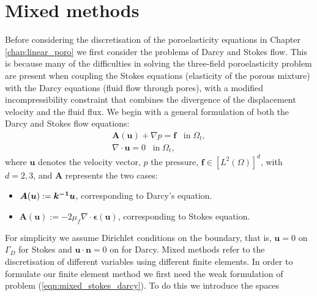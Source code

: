 \section{Mixed methods}
\label{sec:mixed}
Before considering the discretisation of the poroelasticity equations in Chapter \ref{chap:linear_poro} we first consider the problems of Darcy and Stokes flow. 
%
This is because many of the difficulties in solving the three-field poroelasticity problem are present when coupling the Stokes equations (elasticity of the porous mixture) with the Darcy equations (fluid flow through pores), with a modified incompressibility constraint that combines the divergence of the displacement velocity and the fluid flux.  
%
We begin with a general formulation of both the Darcy and Stokes flow equations:%
%
%
\begin{subequations}
\begin{align}
\boldsymbol{A}(\boldsymbol{u})+ \nabla p = \boldsymbol{f}\;\;\; \mbox{in} \; \Omega_{t},\\
\nabla \cdot \boldsymbol{u} =0\;\;\; \mbox{in} \; \Omega_{t},
\end{align}
\label{eqn:mixed_stokes_darcy}
\end{subequations}
where $\boldsymbol{u}$ denotes the velocity vector, $p$ the pressure, $\boldsymbol{f}\in[L^{2}(\Omega)]^{d}$, with $d=2,3$, and $\boldsymbol{A}$ represents the two cases:
\begin{itemize}
\item $\boldsymbol{A}(\boldsymbol{u}):=   \boldsymbol{k^{-1}} \boldsymbol{u}$, corresponding to Darcy's equation.
\item $\boldsymbol{A}(\boldsymbol{u}):= -2 \mu_{f} \nabla \cdot \mathbf{\epsilon}(\boldsymbol{u})$, corresponding to Stokes equation.
\end{itemize}
For simplicity we assume Dirichlet conditions on the boundary, that is, $\boldsymbol{u}=0$ on $\Gamma_{D}$ for Stokes and $\boldsymbol{u} \cdot \boldsymbol{n}  = 0$ on for Darcy.
%
Mixed methods refer to the discretisation of different variables using different finite elements. In order to formulate our finite element method we first need the weak formulation of problem (\ref{eqn:mixed_stokes_darcy}). To do this we introduce the spaces
